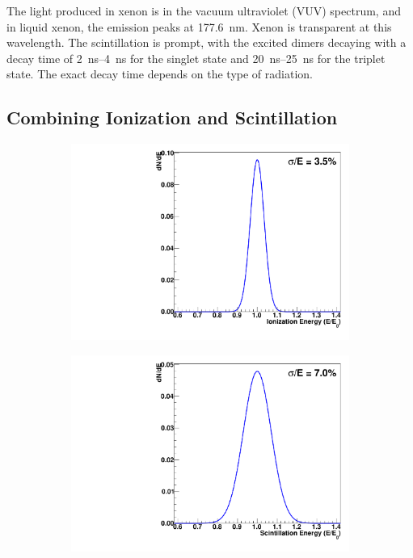 \documentclass[herrin-thesis.tex]{subfiles}
\begin{document}
The light produced in xenon is in the vacuum ultraviolet (VUV) spectrum, and in liquid xenon, the emission peaks at \SI{177.6}{\nm}. Xenon is transparent at this wavelength. The scintillation is prompt, with the excited dimers decaying with a decay time of \SIrange{2}{4}{\ns} for the singlet state and \SIrange{20}{25}{\ns} for the triplet state. The exact decay time depends on the type of radiation\cite{Aprile:2010uq}.

\subsection{Combining Ionization and Scintillation}

\begin{figure}[htb]
\centering
\begin{subfigure}[c]{0.45\linewidth}
\includegraphics[width=\textwidth]{./plots/lxe_anticorrelation_ioniz.pdf}
\end{subfigure}\hspace{0.05\linewidth}\hfill%
\begin{subfigure}[c]{0.45\linewidth}
\includegraphics[width=\textwidth]{./plots/lxe_anticorrelation_scint.pdf}

\end{subfigure}
\end{figure}
\end{document}
